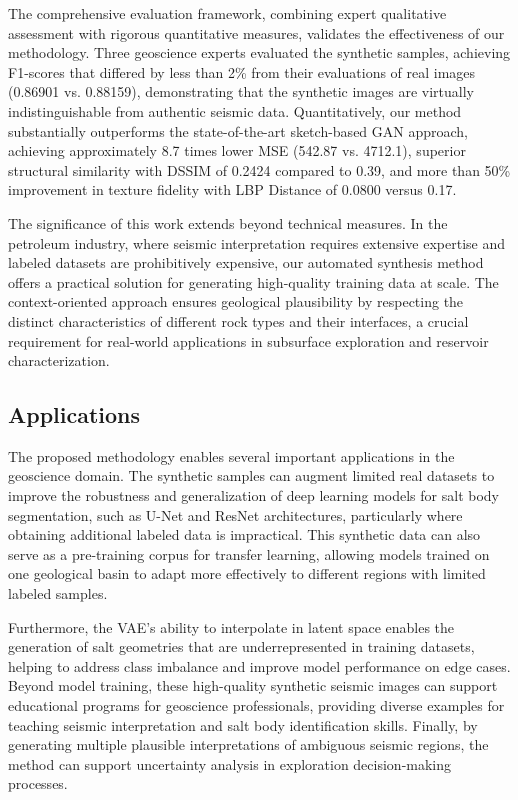 \documentclass{ieeeaccess}
\begin{document}
The comprehensive evaluation framework, combining expert qualitative assessment with rigorous quantitative measures, validates the effectiveness of our methodology. Three geoscience experts evaluated the synthetic samples, achieving F1-scores that differed by less than 2\% from their evaluations of real images (0.86901 vs. 0.88159), demonstrating that the synthetic images are virtually indistinguishable from authentic seismic data. Quantitatively, our method substantially outperforms the state-of-the-art sketch-based GAN approach, achieving approximately 8.7 times lower MSE (542.87 vs. 4712.1), superior structural similarity with DSSIM of 0.2424 compared to 0.39, and more than 50\% improvement in texture fidelity with LBP Distance of 0.0800 versus 0.17.

The significance of this work extends beyond technical measures. In the petroleum industry, where seismic interpretation requires extensive expertise and labeled datasets are prohibitively expensive, our automated synthesis method offers a practical solution for generating high-quality training data at scale. The context-oriented approach ensures geological plausibility by respecting the distinct characteristics of different rock types and their interfaces, a crucial requirement for real-world applications in subsurface exploration and reservoir characterization.

\subsection{Applications}

The proposed methodology enables several important applications in the geoscience domain. The synthetic samples can augment limited real datasets to improve the robustness and generalization of deep learning models for salt body segmentation, such as U-Net and ResNet architectures, particularly where obtaining additional labeled data is impractical. This synthetic data can also serve as a pre-training corpus for transfer learning, allowing models trained on one geological basin to adapt more effectively to different regions with limited labeled samples.

Furthermore, the VAE's ability to interpolate in latent space enables the generation of salt geometries that are underrepresented in training datasets, helping to address class imbalance and improve model performance on edge cases. Beyond model training, these high-quality synthetic seismic images can support educational programs for geoscience professionals, providing diverse examples for teaching seismic interpretation and salt body identification skills. Finally, by generating multiple plausible interpretations of ambiguous seismic regions, the method can support uncertainty analysis in exploration decision-making processes.
\end{document}
